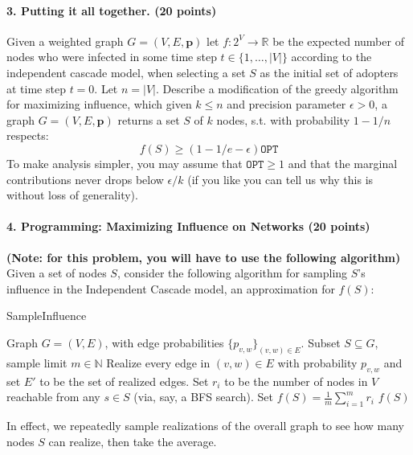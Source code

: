 \documentclass[11pt]{article}
\begin{document}
	\paragraph{3. Putting it all together. (20 points)}  Given a weighted graph $G=(V,E,\mathbf{p})$ let $f:2^V \to \mathbb{R}$ be the expected number of nodes who were infected in some time step $t\in\{1,\ldots,|V|\}$ according to the independent cascade model, when selecting a set $S$ as the initial set of adopters at time step $t=0$.  Let $n=|V|$.  Describe a modification of the greedy algorithm for maximizing influence, which given $k \leq n$ and precision parameter $\epsilon>0$, a graph $G=(V,E,\mathbf{p})$ returns a set $S$ of $k$ nodes, s.t. with probability $1-1/n$ respects: 
	$$f(S)\geq (1-1/e -\epsilon)\texttt{OPT} $$
	To make analysis simpler, you may assume that $\texttt{OPT}\geq 1$ and that the marginal contributions never drops below $\epsilon/k$ (if you like you can tell us why this is without loss of generality).
	
	
	\paragraph{4. Programming: Maximizing Influence on Networks (20 points)}
	\par \textbf{(Note: for this problem, you will have to use the following algorithm)} Given a set of nodes $S$, consider the following algorithm for sampling $S$'s influence in the Independent Cascade model, an approximation for $f(S)$:\\
	
	\begin{algorithm}
		\caption{SampleInfluence}
		\label{alg:sampleinfluence}
		\begin{algorithmic}[1]
			\STATE Graph $G=(V,E)$, with edge probabilities $\{p_{v,w}\}_{(v,w) \in E}$. Subset $S\subseteq G$, sample limit $m \in \mathbb{N}$
			\STATE Realize every edge in $(v,w) \in E$ with probability $p_{v,w}$ and set $E'$ to be the set of realized edges.
			\STATE Set $r_i$ to be the number of nodes in $V$ reachable from any $s \in S$ (via, say, a BFS search).
			\ENDFOR
			\STATE Set $f(S) = \frac{1}{m}\sum_{i=1}^{m}r_i$
			\RETURN $f(S)$
		\end{algorithmic}
	\end{algorithm}
	In effect, we repeatedly sample realizations of the overall graph to see how many nodes $S$ can realize, then take the average.
	
\end{document}
